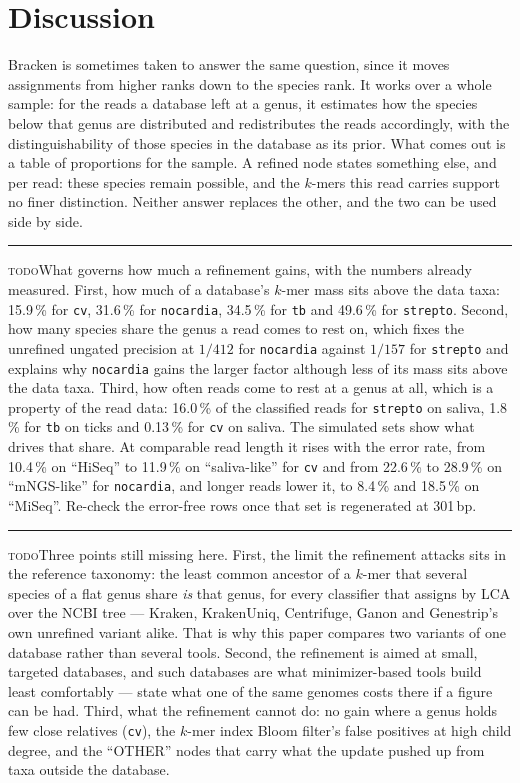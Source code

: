 \documentclass[pdflatex,sn-vancouver-num]{sn-jnl}
\newif\ifshowtodos \showtodostrue
\newcommand{\todo}[1]{%
  \ifshowtodos
    \par\addvspace{0.7\baselineskip}%
    \begin{list}{}{%
      \setlength{\leftmargin}{1.5em}%
      \setlength{\rightmargin}{1.5em}%
      \setlength{\topsep}{0pt}%
      \setlength{\partopsep}{0pt}%
      \setlength{\parsep}{0.5\baselineskip}%
      \setlength{\itemsep}{0pt}%
    }%
    \item[]\footnotesize\color{black!70}%
      \textcolor{orange!65!black}{\rule[-0.2ex]{2pt}{1.15ex}}\hspace{0.55em}%
      \textcolor{orange!65!black}{\textsc{todo}}\hspace{0.6em}\ignorespaces#1%
    \end{list}%
    \addvspace{0.7\baselineskip}%
  \fi%
}
\begin{document}
    \section{Discussion}

    Bracken \citep{lu2017bracken} is sometimes taken to answer the same question, since it moves assignments from higher ranks down to the species rank. It works over a whole sample: for the reads a database left at a genus, it estimates how the species below that genus are distributed and redistributes the reads accordingly, with the distinguishability of those species in the database as its prior. What comes out is a table of proportions for the sample. A refined node states something else, and per read: these species remain possible, and the $k$-mers this read carries support no finer distinction. Neither answer replaces the other, and the two can be used side by side.

    \todo{What governs how much a refinement gains, with the numbers already measured. First, how much of a database's $k$-mer mass sits above the data taxa: \num{15.9}\,\% for \texttt{cv}, \num{31.6}\,\% for \texttt{nocardia}, \num{34.5}\,\% for \texttt{tb} and \num{49.6}\,\% for \texttt{strepto}. Second, how many species share the genus a read comes to rest on, which fixes the unrefined ungated precision at $1/412$ for \texttt{nocardia} against $1/157$ for \texttt{strepto} and explains why \texttt{nocardia} gains the larger factor although less of its mass sits above the data taxa. Third, how often reads come to rest at a genus at all, which is a property of the read data: \num{16.0}\,\% of the classified reads for \texttt{strepto} on saliva, \num{1.8}\,\% for \texttt{tb} on ticks and \num{0.13}\,\% for \texttt{cv} on saliva. The simulated sets show what drives that share. At comparable read length it rises with the error rate, from \num{10.4}\,\% on \enquote{HiSeq} to \num{11.9}\,\% on \enquote{saliva-like} for \texttt{cv} and from \num{22.6}\,\% to \num{28.9}\,\% on \enquote{mNGS-like} for \texttt{nocardia}, and longer reads lower it, to \num{8.4}\,\% and \num{18.5}\,\% on \enquote{MiSeq}. Re-check the error-free rows once that set is regenerated at \num{301}\,bp.}

    \todo{Three points still missing here. First, the limit the refinement attacks sits in the reference taxonomy: the least common ancestor of a $k$-mer that several species of a flat genus share \emph{is} that genus, for every classifier that assigns by LCA over the NCBI tree --- Kraken, KrakenUniq, Centrifuge, Ganon and Genestrip's own unrefined variant alike. That is why this paper compares two variants of one database rather than several tools. Second, the refinement is aimed at small, targeted databases, and such databases are what minimizer-based tools build least comfortably --- state what one of the same genomes costs there if a figure can be had. Third, what the refinement cannot do: no gain where a genus holds few close relatives (\texttt{cv}), the $k$-mer index Bloom filter's false positives at high child degree, and the \enquote{OTHER} nodes that carry what the update pushed up from taxa outside the database.}
\end{document}
